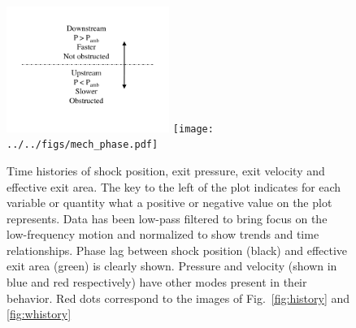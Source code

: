 \documentclass[]{aiaa-tc}%
\begin{document}
\begin{figure}[!h]%
	\begin{center}
	\includegraphics[trim = 3in 0in 2in 0in, clip,width=2.085in]{figs/phase_key.pdf}
	\texttt{[image: ../../figs/mech\_phase.pdf]}
	\end{center}
 	\caption{Time histories of shock position, exit pressure, exit velocity and effective exit area.  The key to the left of the plot indicates for each variable or quantity what a positive or negative value on the plot represents.  Data has been low-pass filtered to bring focus on the low-frequency motion and normalized to show trends and time relationships.  Phase lag between shock position (black) and effective exit area (green) is clearly shown.  Pressure and velocity (shown in blue and red respectively) have other modes present in their behavior.  Red dots correspond to the images of Fig.~\ref{fig:history} and \ref{fig:whistory}   }
 	\label{fig:phase}
\end{figure}
\end{document}
